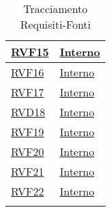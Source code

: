 \begin{longtable}{|>{\centering}m{5cm}|m{5cm}<{\centering}|}
\hyperlink{RVF15}{RVF15} & \hyperlink{Interno}{Interno}\\ \hline

\hyperlink{RVF16}{RVF16} & \hyperlink{Interno}{Interno}\\ \hline

\hyperlink{RVF17}{RVF17} & \hyperlink{Interno}{Interno}\\ \hline

\hyperlink{RVD18}{RVD18} & \hyperlink{Interno}{Interno}\\ \hline

\hyperlink{RVF19}{RVF19} & \hyperlink{Interno}{Interno}\\ \hline

\hyperlink{RVF20}{RVF20} & \hyperlink{Interno}{Interno}\\ \hline

\hyperlink{RVF21}{RVF21} & \hyperlink{Interno}{Interno}\\ \hline

\hyperlink{RVF22}{RVF22} & \hyperlink{Interno}{Interno}\\ \hline

\caption[Tracciamento Requisiti-Fonti]{Tracciamento Requisiti-Fonti}
\label{tabella:requi-fonti}
\end{longtable}
\clearpage
